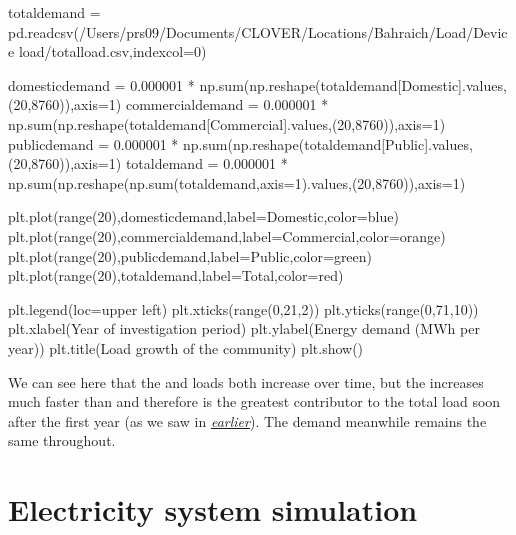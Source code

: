 \documentclass[letterpaper,10pt,english]{sphinxmanual}
\begin{document}
\begin{sphinxVerbatim}[commandchars=\\\{\}]
total\PYGZus{}demand = pd.read\PYGZus{}csv(\PYGZdq{}/Users/prs09/Documents/CLOVER/Locations/Bahraich/Load/Device load/total\PYGZus{}load.csv\PYGZdq{},index\PYGZus{}col=0)

domestic\PYGZus{}demand = 0.000001 * np.sum(np.reshape(total\PYGZus{}demand[\PYGZsq{}Domestic\PYGZsq{}].values,(20,8760)),axis=1)
commercial\PYGZus{}demand = 0.000001 * np.sum(np.reshape(total\PYGZus{}demand[\PYGZsq{}Commercial\PYGZsq{}].values,(20,8760)),axis=1)
public\PYGZus{}demand = 0.000001 * np.sum(np.reshape(total\PYGZus{}demand[\PYGZsq{}Public\PYGZsq{}].values,(20,8760)),axis=1)
total\PYGZus{}demand = 0.000001 * np.sum(np.reshape(np.sum(total\PYGZus{}demand,axis=1).values,(20,8760)),axis=1)

plt.plot(range(20),domestic\PYGZus{}demand,label=\PYGZsq{}Domestic\PYGZsq{},color=\PYGZsq{}blue\PYGZsq{})
plt.plot(range(20),commercial\PYGZus{}demand,label=\PYGZsq{}Commercial\PYGZsq{},color=\PYGZsq{}orange\PYGZsq{})
plt.plot(range(20),public\PYGZus{}demand,label=\PYGZsq{}Public\PYGZsq{},color=\PYGZsq{}green\PYGZsq{})
plt.plot(range(20),total\PYGZus{}demand,label=\PYGZsq{}Total\PYGZsq{},color=\PYGZsq{}red\PYGZsq{})

plt.legend(loc=\PYGZsq{}upper left\PYGZsq{})
plt.xticks(range(0,21,2))
plt.yticks(range(0,71,10))
plt.xlabel(\PYGZsq{}Year of investigation period\PYGZsq{})
plt.ylabel(\PYGZsq{}Energy demand (MWh per year)\PYGZsq{})
plt.title(\PYGZsq{}Load growth of the community\PYGZsq{})
plt.show()
\end{sphinxVerbatim}

\noindent{}

\sphinxAtStartPar
We can see here that the  and  loads both
increase over time, but the  increases much faster than
 and therefore is the greatest contributor to the total
load soon after the first year (as we saw in
{\hyperref[\detokenize{load:varying-demand-throughout-the-year}]{\emph{earlier}}}). The 
demand meanwhile remains the same throughout.


\section{Electricity system simulation}
\label{\detokenize{energy_system_simulation:electricity-system-simulation}}\label{\detokenize{energy_system_simulation::doc}}
\end{document}

